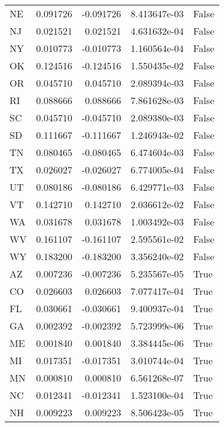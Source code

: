 \begin{table}
\begin{tabular}{lrrrl}
      NE &   0.091726 & -0.091726 &   8.413647e-03 &         False \\
      NJ &   0.021521 &  0.021521 &   4.631632e-04 &         False \\
      NY &   0.010773 & -0.010773 &   1.160564e-04 &         False \\
      OK &   0.124516 & -0.124516 &   1.550435e-02 &         False \\
      OR &   0.045710 &  0.045710 &   2.089394e-03 &         False \\
      RI &   0.088666 &  0.088666 &   7.861628e-03 &         False \\
      SC &   0.045710 & -0.045710 &   2.089380e-03 &         False \\
      SD &   0.111667 & -0.111667 &   1.246943e-02 &         False \\
      TN &   0.080465 & -0.080465 &   6.474604e-03 &         False \\
      TX &   0.026027 & -0.026027 &   6.774005e-04 &         False \\
      UT &   0.080186 & -0.080186 &   6.429771e-03 &         False \\
      VT &   0.142710 &  0.142710 &   2.036612e-02 &         False \\
      WA &   0.031678 &  0.031678 &   1.003492e-03 &         False \\
      WV &   0.161107 & -0.161107 &   2.595561e-02 &         False \\
      WY &   0.183200 & -0.183200 &   3.356240e-02 &         False \\
      AZ &   0.007236 & -0.007236 &   5.235567e-05 &          True \\
      CO &   0.026603 &  0.026603 &   7.077417e-04 &          True \\
      FL &   0.030661 & -0.030661 &   9.400937e-04 &          True \\
      GA &   0.002392 & -0.002392 &   5.723999e-06 &          True \\
      ME &   0.001840 &  0.001840 &   3.384445e-06 &          True \\
      MI &   0.017351 & -0.017351 &   3.010744e-04 &          True \\
      MN &   0.000810 &  0.000810 &   6.561268e-07 &          True \\
      NC &   0.012341 & -0.012341 &   1.523100e-04 &          True \\
      NH &   0.009223 &  0.009223 &   8.506423e-05 &          True \\

\end{tabular}
\end{table}
